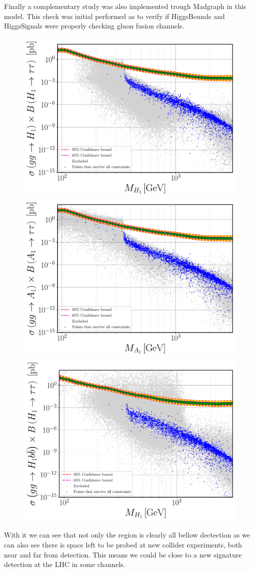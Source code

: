 Finally a complementary study was also implemented trough Madgraph in this model. 
%
This check was initial performed as to verify if HiggsBounds and HiggsSignals were properly checking gluon fusion channels. 
%
\begin{figure}[H]
	\centering
	\includegraphics[width=.49\textwidth]{Images/3HDM/Xsec/Xsec_1_Grey_tight.pdf}	\includegraphics[width=.49\textwidth]{Images/3HDM/Xsec/Xsec_2_Colourful_tight.pdf}
	\includegraphics[width=.49\textwidth]{Images/3HDM/Xsec/Xsec_3_Grey_Thight.pdf}
	\caption{}
	\label{}
\end{figure}	
%
With it we can see that not only the region is clearly all bellow dectection as we can also see there is space left to be probed at new collider experiments, both near and far from detection. 
%
This means we could be close to a new signature detection at the LHC in some channels. 



